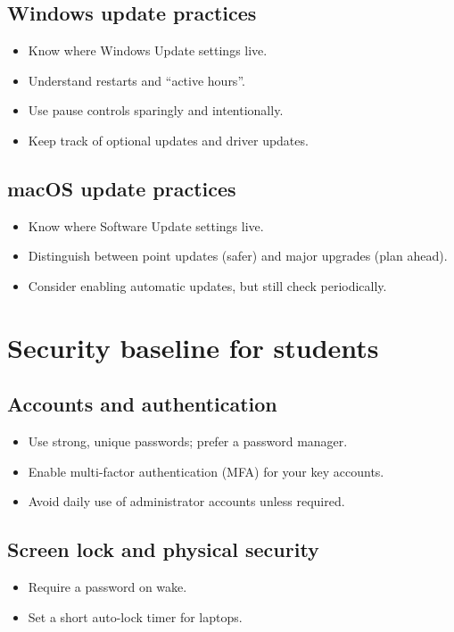 \subsection{Windows update practices}
\begin{itemize}
\item Know where Windows Update settings live.
\item Understand restarts and “active hours”.
\item Use pause controls sparingly and intentionally.
\item Keep track of optional updates and driver updates.
\end{itemize}

\subsection{macOS update practices}
\begin{itemize}
\item Know where Software Update settings live.
\item Distinguish between point updates (safer) and major upgrades (plan ahead).
\item Consider enabling automatic updates, but still check periodically.
\end{itemize}

\section{Security baseline for students}
\subsection{Accounts and authentication}
\begin{itemize}
\item Use strong, unique passwords; prefer a password manager.
\item Enable multi-factor authentication (MFA) for your key accounts.
\item Avoid daily use of administrator accounts unless required.
\end{itemize}

\subsection{Screen lock and physical security}
\begin{itemize}
\item Require a password on wake.
\item Set a short auto-lock timer for laptops.
\end{itemize}

